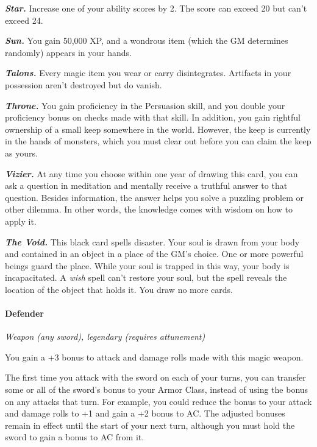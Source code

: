 \documentclass[
]{article}
\begin{document}
\emph{\textbf{Star.}} Increase one of your ability scores by 2. The
score can exceed 20 but can't exceed 24.

\emph{\textbf{Sun.}} You gain 50,000 XP, and a wondrous item (which the
GM determines randomly) appears in your hands.

\emph{\textbf{Talons.}} Every magic item you wear or carry
disintegrates. Artifacts in your possession aren't destroyed but do
vanish.

\emph{\textbf{Throne.}} You gain proficiency in the Persuasion skill,
and you double your proficiency bonus on checks made with that skill. In
addition, you gain rightful ownership of a small keep somewhere in the
world. However, the keep is currently in the hands of monsters, which
you must clear out before you can claim the keep as yours.

\emph{\textbf{Vizier.}} At any time you choose within one year of
drawing this card, you can ask a question in meditation and mentally
receive a truthful answer to that question. Besides information, the
answer helps you solve a puzzling problem or other dilemma. In other
words, the knowledge comes with wisdom on how to apply it.

\emph{\textbf{The Void.}} This black card spells disaster. Your soul is
drawn from your body and contained in an object in a place of the GM's
choice. One or more powerful beings guard the place. While your soul is
trapped in this way, your body is incapacitated. A \emph{wish} spell
can't restore your soul, but the spell reveals the location of the
object that holds it. You draw no more cards.

\hypertarget{defender}{%
\paragraph{Defender}\label{defender}}

\emph{Weapon (any sword), legendary (requires attunement)}

You gain a +3 bonus to attack and damage rolls made with this magic
weapon.

The first time you attack with the sword on each of your turns, you can
transfer some or all of the sword's bonus to your Armor Class, instead
of using the bonus on any attacks that turn. For example, you could
reduce the bonus to your attack and damage rolls to +1 and gain a +2
bonus to AC. The adjusted bonuses remain in effect until the start of
your next turn, although you must hold the sword to gain a bonus to AC
from it.
\end{document}
